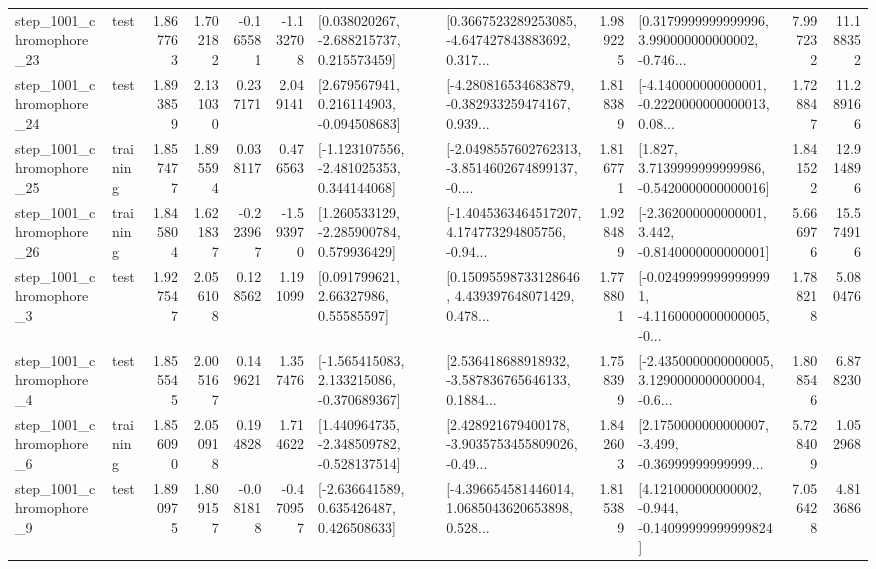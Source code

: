 \begin{tabular}{llrrrrllrlrr}
 step\_1001\_chromophore\_23 &      test &      1.867763 &    1.702182 &     -0.165581 & -1.132708 &    [0.038020267, -2.688215737, 0.215573459] &  [0.3667523289253085, -4.647427843883692, 0.317... &       1.989225 &  [0.3179999999999996, 3.990000000000002, -0.746... &            7.997232 &         11.188352 \\
 step\_1001\_chromophore\_24 &      test &      1.893859 &    2.131030 &      0.237171 &  2.049141 &    [2.679567941, 0.216114903, -0.094508683] &  [-4.280816534683879, -0.382933259474167, 0.939... &       1.818389 &  [-4.140000000000001, -0.2220000000000013, 0.08... &            1.728847 &         11.289166 \\
 step\_1001\_chromophore\_25 &  training &      1.857477 &    1.895594 &      0.038117 &  0.476563 &   [-1.123107556, -2.481025353, 0.344144068] &  [-2.0498557602762313, -3.8514602674899137, -0.... &       1.816771 &   [1.827, 3.7139999999999986, -0.5420000000000016] &            1.841522 &         12.914896 \\
 step\_1001\_chromophore\_26 &  training &      1.845804 &    1.621837 &     -0.223967 & -1.593970 &    [1.260533129, -2.285900784, 0.579936429] &  [-1.4045363464517207, 4.174773294805756, -0.94... &       1.928489 &   [-2.362000000000001, 3.442, -0.8140000000000001] &            5.666976 &         15.574916 \\
  step\_1001\_chromophore\_3 &      test &      1.927547 &    2.056108 &      0.128562 &  1.191099 &       [0.091799621, 2.66327986, 0.55585597] &  [0.15095598733128646, 4.439397648071429, 0.478... &       1.778801 &  [-0.02499999999999991, -4.1160000000000005, -0... &            1.788218 &          5.080476 \\
  step\_1001\_chromophore\_4 &      test &      1.855545 &    2.005167 &      0.149621 &  1.357476 &   [-1.565415083, 2.133215086, -0.370689367] &  [2.536418688918932, -3.587836765646133, 0.1884... &       1.758399 &  [-2.4350000000000005, 3.1290000000000004, -0.6... &            1.808546 &          6.878230 \\
  step\_1001\_chromophore\_6 &  training &      1.856090 &    2.050918 &      0.194828 &  1.714622 &   [1.440964735, -2.348509782, -0.528137514] &  [2.428921679400178, -3.9035753455809026, -0.49... &       1.842603 &  [2.1750000000000007, -3.499, -0.36999999999999... &            5.728409 &          1.052968 \\
  step\_1001\_chromophore\_9 &      test &      1.890975 &    1.809157 &     -0.081818 & -0.470957 &    [-2.636641589, 0.635426487, 0.426508633] &  [-4.396654581446014, 1.0685043620653898, 0.528... &       1.815389 &  [4.121000000000002, -0.944, -0.14099999999999824] &            7.056428 &          4.813686 \\

\end{tabular}

